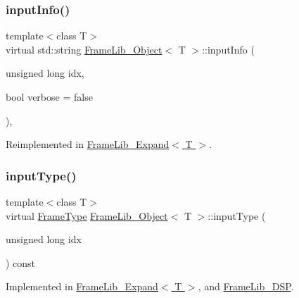 \mbox{\label{class_frame_lib___object_a49abea5f18125c425b1eae8710735891}} 
\subsubsection{\texorpdfstring{input\+Info()}{inputInfo()}}
{\footnotesize\ttfamily template$<$class T$>$ \\
virtual std\+::string \hyperlink{class_frame_lib___object}{Frame\+Lib\+\_\+\+Object}$<$ T $>$\+::input\+Info (\begin{DoxyParamCaption}\item[{unsigned long}]{idx,  }\item[{bool}]{verbose = {\ttfamily false} }\end{DoxyParamCaption})\hspace{0.3cm}{\ttfamily [inline]}, {\ttfamily [virtual]}}



Reimplemented in \hyperlink{class_frame_lib___expand_a0e29df27f7dac1cd8082a468a24fe07e}{Frame\+Lib\+\_\+\+Expand$<$ T $>$}.

\mbox{\label{class_frame_lib___object_ab1ab1ae8180bb8b7e881aac6a4e1066c}} 
\subsubsection{\texorpdfstring{input\+Type()}{inputType()}}
{\footnotesize\ttfamily template$<$class T$>$ \\
virtual \hyperlink{_frame_lib___types_8h_ad495a9f61af7fff07d7e97979d1ab854}{Frame\+Type} \hyperlink{class_frame_lib___object}{Frame\+Lib\+\_\+\+Object}$<$ T $>$\+::input\+Type (\begin{DoxyParamCaption}\item[{unsigned long}]{idx }\end{DoxyParamCaption}) const\hspace{0.3cm}{\ttfamily [pure virtual]}}



Implemented in \hyperlink{class_frame_lib___expand_ad5300f03d5fe2531a97ecb4e28a044bf}{Frame\+Lib\+\_\+\+Expand$<$ T $>$}, and \hyperlink{class_frame_lib___d_s_p_abbe65d74de56ab71e7fba34380bd19dc}{Frame\+Lib\+\_\+\+D\+SP}.

